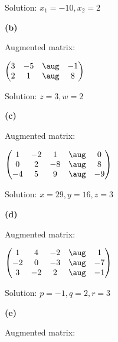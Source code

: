 \documentclass[oneside,12pt]{amsart}
\begin{document}
Solution: $x_1 = -10, x_2 = 2$

\bigskip


\textbf{(b)}

Augmented matrix:

\bigskip

$
\begin{pmatrix}
   3  &  -5  & \aug & -1  \\
   2  &  1  & \aug  & 8  \\
\end{pmatrix}
$

\bigskip

Solution: $z = 3, w = 2$


\bigskip

\textbf{(c)}

Augmented matrix:

\bigskip

$
\begin{pmatrix}
   1  & -2   & 1  & \aug  & 0  \\
   0  &  2   & -8 & \aug  & 8  \\
   -4 &  5   & 9  & \aug  & -9  \\
\end{pmatrix}
$

\bigskip

Solution: $x=29, y=16, z=3$


\bigskip

\textbf{(d)}

Augmented matrix:

\bigskip

$
\begin{pmatrix}
   1   &  4   & -2  & \aug  & 1  \\
   -2  &  0   & -3  & \aug  & -7  \\
   3   &  -2  &  2  & \aug  & -1  \\
\end{pmatrix}
$

\bigskip

Solution: $p=-1, q=2, r=3$


\bigskip

\textbf{(e)}

Augmented matrix:
\end{document}
